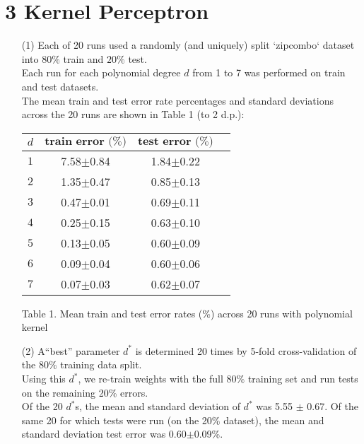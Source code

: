 \documentclass[a4paper,12pt]{article}
\begin{document}
\section*{3 Kernel Perceptron}
\begin{enumerate}

\item[(1)] 
Each of 20 runs used a randomly (and uniquely) split `zipcombo` dataset into $80\%$ train and $20\%$ test. \\
Each run for each polynomial degree $d$ from 1 to 7 was performed on train and test datasets.\\
The mean train and test error rate percentages and standard deviations across the 20 runs are shown in Table 1 (to 2 d.p.):

\begin{tabular}{|c|c|c|c|}
\hline
$d$&$\textbf{train error (\%)}$&$\textbf{test error (\%)}$\\
\hline
$1$&7.58$\pm$0.84&1.84$\pm$0.22\\
\hline
$2$&1.35$\pm$0.47&0.85$\pm$0.13\\
\hline
$3$&0.47$\pm$0.01&0.69$\pm$0.11\\
\hline
$4$&0.25$\pm$0.15&0.63$\pm$0.10\\
\hline
$5$&0.13$\pm$0.05&0.60$\pm$0.09\\
\hline
$6$&0.09$\pm$0.04&0.60$\pm$0.06\\
\hline
$7$&0.07$\pm$0.03&0.62$\pm$0.07\\
\hline
\end{tabular}\par 
Table 1. Mean train and test error rates (\%) across 20 runs with polynomial kernel

\item[(2)] 
A``best” parameter $d^*$ is determined 20 times by 5-fold cross-validation of the $80\%$ training data split. \\
Using this $d^*$, we re-train weights with the full $80\%$ training set and run tests on the remaining 20\% errors. \\
Of the 20 $d^*$s, the mean and standard deviation  of $d^*$ was 5.55 $\pm$ 0.67.
Of the same 20 for which tests were run (on the 20\% dataset), the mean and standard deviation test error was 0.60$\pm$0.09\%.

\end{enumerate}
\clearpage
\end{document}
